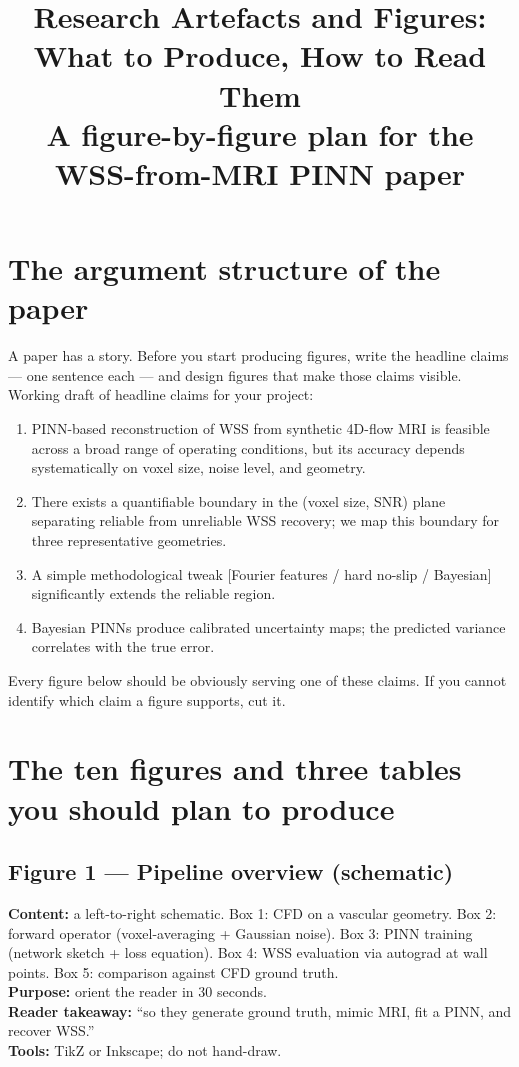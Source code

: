 \documentclass[11pt]{article}
\title{\bfseries Research Artefacts and Figures: What to Produce, How to Read Them\\[0.3em]
\large A figure-by-figure plan for the WSS-from-MRI PINN paper}
\author{}
\date{}
\begin{document}
\maketitle

\section*{The argument structure of the paper}
A paper has a story. Before you start producing figures, write the headline claims --- one sentence each --- and design figures that make those claims visible. Working draft of headline claims for your project:

\begin{enumerate}[label=\textbf{C\arabic*.}, leftmargin=2em]
\item PINN-based reconstruction of WSS from synthetic 4D-flow MRI is feasible across a broad range of operating conditions, but its accuracy depends systematically on voxel size, noise level, and geometry.
\item There exists a quantifiable boundary in the (voxel size, SNR) plane separating reliable from unreliable WSS recovery; we map this boundary for three representative geometries.
\item A simple methodological tweak [Fourier features / hard no-slip / Bayesian] significantly extends the reliable region.
\item Bayesian PINNs produce calibrated uncertainty maps; the predicted variance correlates with the true error.
\end{enumerate}

Every figure below should be obviously serving one of these claims. If you cannot identify which claim a figure supports, cut it.

\section{The ten figures and three tables you should plan to produce}

\subsection*{Figure 1 --- Pipeline overview (schematic)}
\textbf{Content:} a left-to-right schematic. Box 1: CFD on a vascular geometry. Box 2: forward operator (voxel-averaging + Gaussian noise). Box 3: PINN training (network sketch + loss equation). Box 4: WSS evaluation via autograd at wall points. Box 5: comparison against CFD ground truth.\\
\textbf{Purpose:} orient the reader in 30 seconds.\\
\textbf{Reader takeaway:} ``so they generate ground truth, mimic MRI, fit a PINN, and recover WSS.''\\
\textbf{Tools:} TikZ or Inkscape; do not hand-draw.
\end{document}
